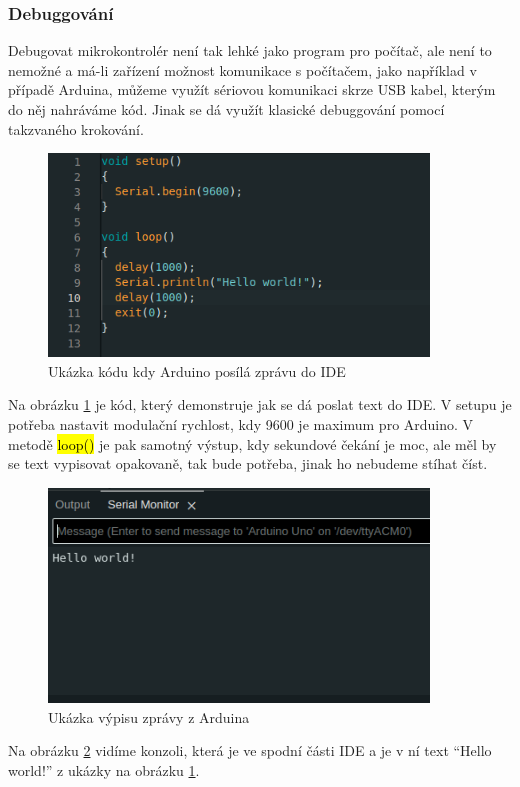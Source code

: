 \subsubsection{Debuggování}
Debugovat mikrokontrolér není tak lehké jako program pro počítač, ale není to nemožné a má-li zařízení možnost komunikace s počítačem, jako například v případě Arduina, můžeme využít sériovou komunikaci skrze USB kabel, kterým do něj nahráváme kód. Jinak se dá využít klasické debuggování pomocí takzvaného krokování.
\begin{figure}[H]
	\centering
	\includegraphics[width=0.9\textwidth]{pictures/code.png}
    	\caption{Ukázka kódu kdy Arduino posílá zprávu do IDE}
   	\label{fig:usbIDE}
\end{figure}

Na obrázku \ref{fig:usbIDE} je kód, který demonstruje jak se dá poslat text do IDE. V setupu je potřeba nastavit modulační rychlost, kdy 9600 je maximum pro Arduino. V metodě \hl{loop()} je pak samotný výstup, kdy sekundové čekání je moc, ale měl by se text vypisovat opakovaně, tak bude potřeba, jinak ho nebudeme stíhat číst.

\begin{figure}[H]
	\centering
	\includegraphics[width=0.9\textwidth]{pictures/message.png}
    	\caption{Ukázka výpisu zprávy z Arduina}
   	\label{fig:msgIDE}
\end{figure}
Na obrázku \ref{fig:msgIDE} vidíme konzoli, která je ve spodní části IDE a je v ní text “Hello world!” z ukázky na obrázku \ref{fig:usbIDE}.

